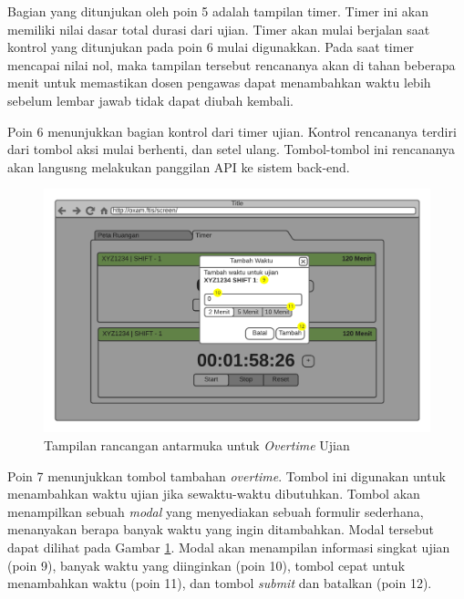     Bagian yang ditunjukan oleh poin 5 adalah tampilan timer. Timer ini akan memiliki nilai dasar total
    durasi dari ujian. Timer akan mulai berjalan saat kontrol yang ditunjukan pada poin 6 mulai digunakkan.
    Pada saat timer mencapai nilai nol, maka tampilan tersebut rencananya akan di tahan beberapa menit
    untuk memastikan dosen pengawas dapat menambahkan waktu lebih sebelum lembar jawab tidak dapat diubah
    kembali.
    
    Poin 6 menunjukkan bagian kontrol dari timer ujian. Kontrol rencananya terdiri dari tombol aksi mulai
    berhenti, dan setel ulang. Tombol-tombol ini rencananya akan langusng melakukan panggilan API
    ke sistem back-end.
    
    \begin{figure}
        \centering
        \includegraphics[width=0.7\paperwidth]{Gambar/mockups/Mockup--DosenPengawas - Timer + Overtime.pdf}
        \caption{Tampilan rancangan antarmuka untuk \textit{Overtime} Ujian}
        \label{fig:mockup_dosen_overtime}
    \end{figure}
    
    Poin 7 menunjukkan tombol tambahan \textit{overtime}. Tombol ini digunakan untuk menambahkan waktu
    ujian jika sewaktu-waktu dibutuhkan. Tombol akan menampilkan sebuah \textit{modal} yang menyediakan
    sebuah formulir sederhana, menanyakan berapa banyak waktu yang ingin ditambahkan. Modal tersebut
    dapat dilihat pada Gambar \ref{fig:mockup_dosen_overtime}. Modal akan menampilan informasi
    singkat ujian (poin 9), banyak waktu yang diinginkan (poin 10), tombol cepat untuk menambahkan waktu
    (poin 11), dan tombol \textit{submit} dan batalkan (poin 12).
    

